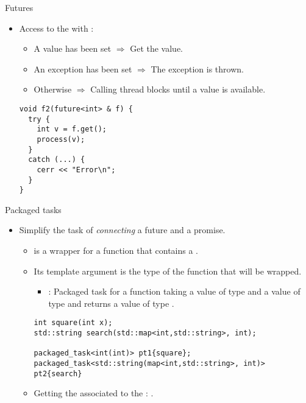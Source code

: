 \begin{frame}[t,fragile]{Futures}
\begin{itemize}
  \item Access to the  with :
    \begin{itemize}
      \item A value has been set $\Rightarrow$ Get the value.
      \item An exception has been set $\Rightarrow$ The exception is thrown.
      \item Otherwise $\Rightarrow$ Calling thread blocks until a value is available.
    \end{itemize}

\begin{lstlisting}
void f2(future<int> & f) {
  try {
    int v = f.get();
    process(v);
  }
  catch (...) {
    cerr << "Error\n";
  }
}
\end{lstlisting}
\end{itemize}
\end{frame}

\begin{frame}[t,fragile]{Packaged tasks}
\begin{itemize}
  \item Simplify the task of \emph{connecting} a future and a promise.
    \begin{itemize}
      \item {} 
            is a wrapper for a function that contains a .

      \item Its template argument is the type of the function that will be wrapped.
        \begin{itemize}
          \item {}: 
                Packaged task for a function taking a value of type 
                and a value of type  and returns a value of type .
        \end{itemize}
\begin{lstlisting}
int square(int x);
std::string search(std::map<int,std::string>, int);

packaged_task<int(int)> pt1{square};
packaged_task<std::string(map<int,std::string>, int)> pt2{search}
\end{lstlisting}

      \item Getting the  associated to the 
            : .
    \end{itemize}
\end{itemize}
\end{frame}


